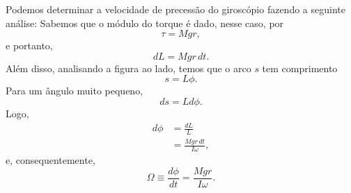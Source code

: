 Podemos determinar a velocidade de precessão do giroscópio fazendo a seguinte análise: Sabemos que o módulo do torque é dado, nesse caso, por
\begin{equation}
  \tau = Mgr,
\end{equation}
%
e portanto,
\begin{equation}
  dL = Mgr\,dt.
\end{equation}
%
Além disso, analisando a figura ao lado, temos que o arco $s$ tem comprimento
\begin{equation}
  s = L \phi.
\end{equation}
%
Para um ângulo muito pequeno,
\begin{equation}
  ds = L d\phi.
\end{equation}
%
Logo,
\begin{align}
  d\phi &= \frac{dL}{L} \\
  &= \frac{Mgr\,dt}{I\omega},
\end{align}
%
e, consequentemente,
\begin{equation}
  \Omega \equiv \frac{d\phi}{dt} = \frac{Mgr}{I\omega}.
\end{equation}

